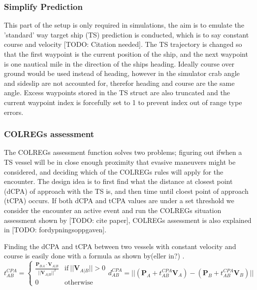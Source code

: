 \subsubsection{Simplify Prediction}
This part of the setup is only required in simulations, the aim is to emulate the 'standard' way target ship (TS) prediction is conducted,
which is to say constant course and velocity [TODO: Citation needed]. The TS trajectory is changed so that the first waypoint is the current position of the
ship, and the next waypoint is one nautical mile in the direction of the ships heading. Ideally course over ground would be used instead of heading, however
in the simulator crab angle and sideslip are not accounted for, therefor heading and course are the same angle.
Excess waypoints stored in the TS struct are also truncated and the current waypoint index is forcefully set to 1 to prevent index out of range type errors.


\subsubsection{COLREGs assessment}
The COLREGs assessment function solves two problems; figuring out if\/when a TS vessel will be in close enough proximity that evasive maneuvers might be considered,
and deciding which of the COLREGs rules will apply for the encounter. The design idea is to first find what the distance at closest point (dCPA) of approach with the TS is, and then
time until cloest point of approach (tCPA) occurs. If both dCPA and tCPA values are under a set threshold we consider the encounter an active event and run the
COLREGs situation assessment shown by [TODO: cite paper], COLREGs assessment is also explained in [TODO: fordypningsoppgaven].

Finding the dCPA and tCPA between two vessels with constant velocity and course is easily done with a formula as shown by(eller in?) \cite{Kufoalor2018}.
\begin{subequations}    \label{eq:tCPAdCPA}
\begin{equation}
    t_{AB}^{CPA} = 
    \begin{cases}
      \frac{\textbf{P}_{BA} \cdot \textbf{V}_{A|B}}{||\textbf{V}_{A|B}||^2} & \text{if}\ ||\textbf{V}_{A|B}|| > 0 \\
      0 & \text{otherwise}
    \end{cases}
\end{equation}
\begin{equation}
    d_{AB}^{CPA} = ||(\textbf{P}_A + t_{AB}^{CPA} \textbf{V}_A) - (\textbf{P}_B + t_{AB}^{CPA} \textbf{V}_B)||
\end{equation}
\end{subequations}

